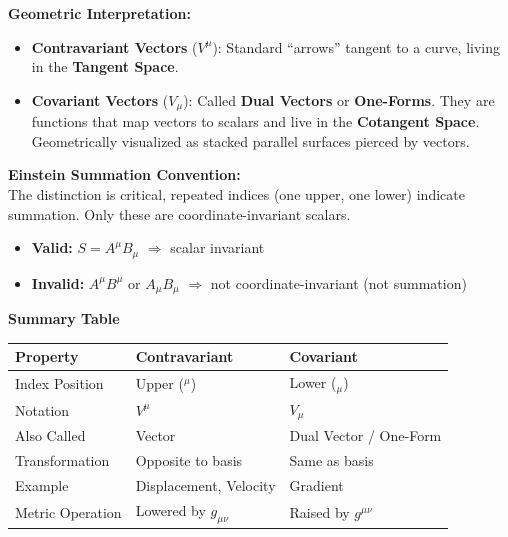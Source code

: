 \begin{foundation}
  \bigskip\noindent
  \noindent\textbf{Geometric Interpretation:}
  \smallskip\noindent
  \begin{itemize}
    \item \textbf{Contravariant Vectors} ($V^\mu$): Standard ``arrows'' tangent to a curve, living in the \textbf{Tangent Space}.
    \medskip
    \item \textbf{Covariant Vectors} ($V_\mu$): Called \textbf{Dual Vectors} or \textbf{One-Forms}. They are functions that map vectors to scalars and live in the \textbf{Cotangent Space}. Geometrically visualized as stacked parallel surfaces pierced by vectors.
  \end{itemize}

  \bigskip\noindent
  \noindent\textbf{Einstein Summation Convention:} \\
  \smallskip\noindent
  The distinction is critical, repeated indices (one upper, one lower) indicate summation. Only these are coordinate-invariant scalars.
  \medskip
  \begin{itemize}
    \item \textbf{Valid:} $S = A^\mu B_\mu$ \quad $\Rightarrow$ scalar invariant
    \item \textbf{Invalid:} $A^\mu B^\mu$ or $A_\mu B_\mu$ \quad $\Rightarrow$ not coordinate-invariant (not summation)
  \end{itemize}

  \bigskip\noindent
  \noindent\textbf{Summary Table}
  \bigskip\noindent
  \begin{center}
  \begin{tabular}{@{}lll@{}}
    \toprule
    \textbf{Property} & \textbf{Contravariant} & \textbf{Covariant} \\
    \midrule
    Index Position & Upper ($^\mu$) & Lower ($_\mu$) \\
    Notation & $V^\mu$ & $V_\mu$ \\
    Also Called & Vector & Dual Vector / One-Form \\
    Transformation & Opposite to basis & Same as basis \\
    Example & Displacement, Velocity & Gradient \\
    Metric Operation & Lowered by $g_{\mu\nu}$ & Raised by $g^{\mu\nu}$ \\
    \bottomrule
  \end{tabular}
  \end{center}

\end{foundation}

